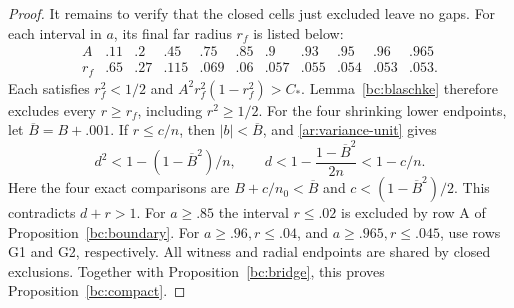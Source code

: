 \documentclass[11pt,reqno]{amsart}
\numberwithin{equation}{section}
\theoremstyle{definition}
\theoremstyle{remark}
\begin{document}
\begin{proof}
It remains to verify that the closed cells just excluded leave no
gaps.  For each interval in $a$, its final far radius $r_f$ is listed
below:
\begin{equation}\label{bc:far-table}
\begin{array}{c|rrrrrrrrrr}
 A&.11&.2&.45&.75&.85&.9&.93&.95&.96&.965\\ \hline
 r_f&.65&.27&.115&.069&.06&.057&.055&.054&.053&.053.
\end{array}
\end{equation}
Each satisfies $r_f^2<1/2$ and
$A^2r_f^2(1-r_f^2)>C_*$.  Lemma~\ref{bc:blaschke} therefore
excludes every $r\geq r_f$, including $r^2\geq1/2$.
For the four shrinking lower endpoints, let
$\overline B=B+.001$.  If $r\leq c/n$, then $|b|<\overline B$,
and \eqref{ar:variance-unit} gives
\[
 d^2<1-(1-\overline B^2)/n,\qquad
 d<1-\frac{1-\overline B^2}{2n}<1-c/n.
\]
Here the four exact comparisons are $B+c/n_0<\overline B$ and
$c<(1-\overline B^2)/2$.
This contradicts $d+r>1$.
For $a\geq.85$ the interval $r\leq.02$ is excluded by row A of
Proposition~\ref{bc:boundary}.  For $a\geq.96,r\leq.04$, and
$a\geq.965,r\leq.045$, use rows G1 and G2, respectively.
All witness and radial endpoints are shared by closed exclusions.
Together with Proposition~\ref{bc:bridge}, this proves
Proposition~\ref{bc:compact}.
\end{proof}
\end{document}
